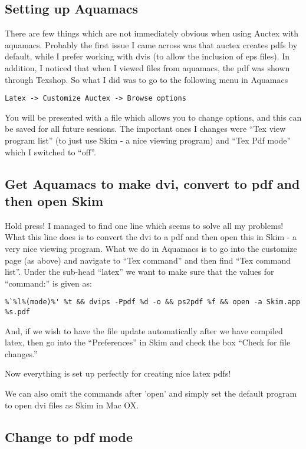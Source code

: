 \documentclass[a4paper, 10pt]{article}
\begin{document}
\subsection*{Setting up Aquamacs}
There are few things which are not immediately obvious when using Auctex with aquamacs. Probably the first issue I came across was that auctex creates pdfs by default, while I prefer working with dvis (to allow the inclusion of eps files). In addition, I noticed that when I viewed files from aquamacs, the pdf was shown through Texshop. So what I did was to go to the following menu in Aquamacs
\begin{verbatim}
Latex -> Customize Auctex -> Browse options
\end{verbatim}
You will be presented with a file which allows you to change options, and this can be saved for all future sessions. The important ones I changes were ``Tex view program list'' (to just use Skim - a nice viewing program) and ``Tex Pdf mode'' which I switched to ``off''.

\subsection*{Get Aquamacs to make dvi, convert to pdf and then open Skim}
Hold press! I managed to find one line which seems to solve all my problems! What this line does is to convert the dvi to a pdf and then open this in Skim - a very nice viewing program. What we do in Aquamacs is to go into the customize page (as above) and navigate to ``Tex command'' and then find ``Tex command list''.  Under the sub-head ``latex'' we want to make sure that the values for ``command:'' is given as:
\begin{verbatim}
%`%l%(mode)%' %t && dvips -Ppdf %d -o && ps2pdf %f && open -a Skim.app %s.pdf
\end{verbatim}

And, if we wish to have the file update automatically after we have compiled latex, then go into the ``Preferences'' in Skim and check the box ``Check for file changes.''

Now everything is set up perfectly for creating nice latex pdfs!

We can also omit the commands after 'open' and simply set the default
program to open dvi files as Skim in Mac OX.

\subsection*{Change to pdf mode}
\label{sec:change-pdf-mode}
\end{document}
